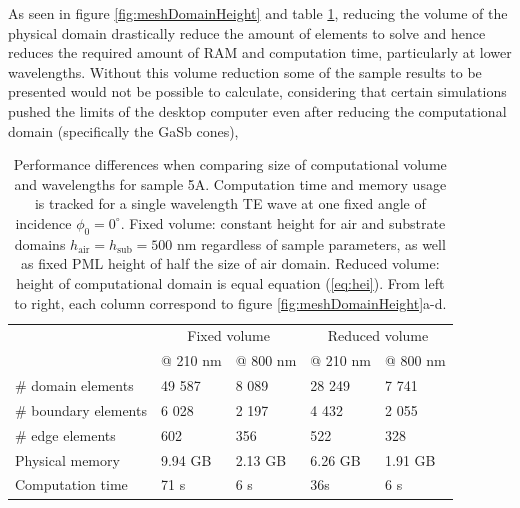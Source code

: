 As seen in figure \ref{fig:meshDomainHeight} and table \ref{tab:domainHeight}, reducing the volume of the physical domain drastically reduce the amount of elements to solve and hence reduces the required amount of RAM and computation time, particularly at lower wavelengths. Without this volume reduction some of the sample results to be presented would not be possible to calculate, considering that certain simulations pushed the limits of the desktop computer even after reducing the computational domain (specifically the GaSb cones), 

 \begin{table}[htb!]
    \centering
    \caption{Performance differences when comparing size of computational volume and wavelengths for sample 5A. Computation time and memory usage is tracked for a single wavelength TE wave at one fixed angle of incidence $\phi_0=0^\circ$. Fixed volume: constant height for air and substrate domains $h_{\text{air}}=h_{\text{sub}}=500$ nm regardless of sample parameters, as well as fixed PML height of half the size of air domain. Reduced volume: height of computational domain is equal equation (\ref{eq:hei}). From left to right, each column correspond to figure \ref{fig:meshDomainHeight}a-d.}
    \label{tab:domainHeight}
    \begin{tabular}{l l l l l}
    & \multicolumn{2}{c}{Fixed volume} & \multicolumn{2}{c}{Reduced volume} \\
            &   @ 210 nm    &  @ 800 nm    &  @ 210 nm        & @ 800 nm \\
    \hline 
    $\#$ domain elements    &   49 587      &   8 089       &   28 249      &   7 741\\
    $\#$ boundary elements  &   6 028       &   2 197       &   4 432       &   2 055\\
    $\#$ edge elements      &   602         &   356         &   522         &   328\\
    Physical memory         &   9.94 GB      &   2.13 GB      &   6.26 GB      &   1.91 GB\\
    Computation time        &   71 s    &   6 s          &   36s          &   6 s\\ %
    \hline
    \end{tabular}
\end{table}


